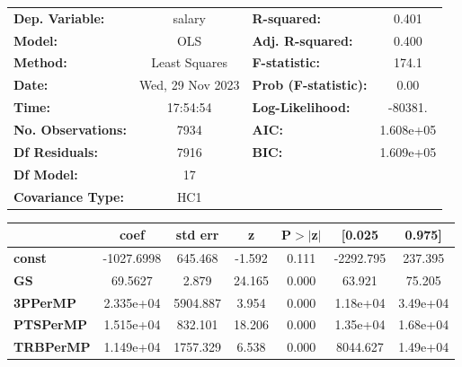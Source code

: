 \begin{center}
\begin{tabular}{lclc}
\toprule
\textbf{Dep. Variable:}             &      salary      & \textbf{  R-squared:         } &     0.401   \\
\textbf{Model:}                     &       OLS        & \textbf{  Adj. R-squared:    } &     0.400   \\
\textbf{Method:}                    &  Least Squares   & \textbf{  F-statistic:       } &     174.1   \\
\textbf{Date:}                      & Wed, 29 Nov 2023 & \textbf{  Prob (F-statistic):} &     0.00    \\
\textbf{Time:}                      &     17:54:54     & \textbf{  Log-Likelihood:    } &   -80381.   \\
\textbf{No. Observations:}          &        7934      & \textbf{  AIC:               } & 1.608e+05   \\
\textbf{Df Residuals:}              &        7916      & \textbf{  BIC:               } & 1.609e+05   \\
\textbf{Df Model:}                  &          17      & \textbf{                     } &             \\
\textbf{Covariance Type:}           &       HC1        & \textbf{                     } &             \\
\bottomrule
\end{tabular}
\begin{tabular}{lcccccc}
                                    & \textbf{coef} & \textbf{std err} & \textbf{z} & \textbf{P$> |$z$|$} & \textbf{[0.025} & \textbf{0.975]}  \\
\midrule
\textbf{const}                      &   -1027.6998  &      645.468     &    -1.592  &         0.111        &    -2292.795    &      237.395     \\
\textbf{GS}                         &      69.5627  &        2.879     &    24.165  &         0.000        &       63.921    &       75.205     \\
\textbf{3PPerMP}                    &    2.335e+04  &     5904.887     &     3.954  &         0.000        &     1.18e+04    &     3.49e+04     \\
\textbf{PTSPerMP}                   &    1.515e+04  &      832.101     &    18.206  &         0.000        &     1.35e+04    &     1.68e+04     \\
\textbf{TRBPerMP}                   &    1.149e+04  &     1757.329     &     6.538  &         0.000        &     8044.627    &     1.49e+04     \\

\end{tabular}
\end{center}
